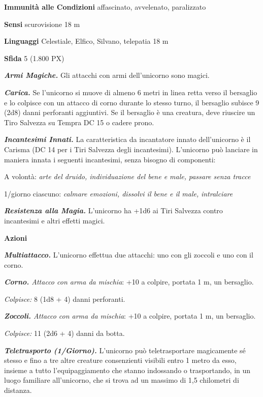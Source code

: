 \begin{multicols}{2}
\textbf{Immunità alle Condizioni} affascinato, avvelenato, paralizzato

\textbf{Sensi} scurovisione 18 m

\textbf{Linguaggi} Celestiale, Elfico, Silvano, telepatia 18 m

\textbf{Sfida} 5 (1.800 PX)

\textit{\textbf{Armi Magiche.}} Gli attacchi con armi dell'unicorno sono magici.

\textit{\textbf{Carica.}} Se l'unicorno si muove di almeno 6 metri in linea retta verso il bersaglio e lo colpisce con un attacco di corno durante lo stesso turno, il bersaglio subisce 9 (2d8) danni perforanti aggiuntivi. Se il bersaglio è una creatura, deve riuscire un Tiro Salvezza su Tempra DC 15 o cadere prono.

\textit{\textbf{Incantesimi Innati.}} La caratteristica da incantatore innato dell'unicorno è il Carisma (DC 14 per i Tiri Salvezza degli incantesimi). L'unicorno può lanciare in maniera innata i seguenti incantesimi, senza bisogno di componenti:

A volontà: \textit{arte del druido, individuazione del bene e male,} \textit{passare senza tracce}

1/giorno ciascuno: \textit{calmare emozioni, dissolvi il bene e il male,} \textit{intralciare}

\textit{\textbf{Resistenza alla Magia.}} L'unicorno ha +1d6 ai Tiri Salvezza contro incantesimi e altri effetti magici.

\textbf{Azioni}

\textit{\textbf{Multiattacco.}} L'unicorno effettua due attacchi: uno con gli zoccoli e uno con il corno.

\textit{\textbf{Corno.} Attacco con arma da mischia}: +10 a colpire, portata 1 m, un bersaglio.

\textit{Colpisce:} 8 (1d8 + 4) danni perforanti.

\textit{\textbf{Zoccoli.} Attacco con arma da mischia}: +10 a colpire, portata 1 m, un bersaglio.

\textit{Colpisce:} 11 (2d6 + 4) danni da botta.

\textit{\textbf{Teletrasporto (1/Giorno).}} L'unicorno può teletrasportare magicamente sé stesso e fino a tre altre creature consenzienti visibili entro 1 metro da esso, insieme a tutto l'equipaggiamento che stanno indossando o trasportando, in un luogo familiare all'unicorno, che si trova ad un massimo di 1,5 chilometri di distanza.


\end{multicols}
